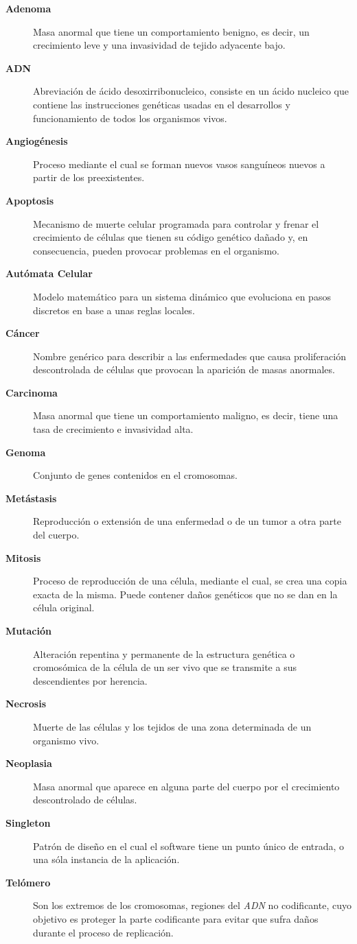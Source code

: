 \begin{description}
    \item[\textbf{Adenoma}] Masa anormal que tiene un comportamiento benigno, es decir, un crecimiento leve y una invasividad de tejido adyacente bajo.
    \item[\textbf{ADN}] Abreviación de ácido desoxirribonucleico, consiste en un ácido nucleico que contiene las instrucciones genéticas usadas en el desarrollos y funcionamiento de todos los organismos vivos.
    \item[\textbf{Angiogénesis}] Proceso mediante el cual se forman nuevos vasos sanguíneos nuevos a partir de los preexistentes.
    \item[\textbf{Apoptosis}] Mecanismo de muerte celular programada para controlar y frenar el crecimiento de células que tienen su código genético dañado y, en consecuencia, pueden provocar problemas en el organismo.
    \item[\textbf{Autómata Celular}] Modelo matemático para un sistema dinámico que evoluciona en pasos discretos en base a unas reglas locales.
    \item[\textbf{Cáncer}] Nombre genérico para describir a las enfermedades que causa proliferación descontrolada de células que provocan la aparición de masas anormales.
    \item[\textbf{Carcinoma}] Masa anormal que tiene un comportamiento maligno, es decir, tiene una tasa de crecimiento e invasividad alta.
    \item[\textbf{Genoma}] Conjunto de genes contenidos en el cromosomas.
    \item[\textbf{Metástasis}] Reproducción o extensión de una enfermedad o de un tumor a otra parte del cuerpo.
    \item[\textbf{Mitosis}] Proceso de reproducción de una célula, mediante el cual, se crea una copia exacta de la misma. Puede contener daños genéticos que no se dan en la célula original.
    \item[\textbf{Mutación}] Alteración repentina y permanente de la estructura genética o cromosómica de la célula de un ser vivo que se transmite a sus descendientes por herencia.
    \item[\textbf{Necrosis}] Muerte de las células y los tejidos de una zona determinada de un organismo vivo.
    \item[\textbf{Neoplasia}] Masa anormal que aparece en alguna parte del cuerpo por el crecimiento descontrolado de células.
    \item[\textbf{Singleton}] Patrón de diseño en el cual el software tiene un punto único de entrada, o una sóla instancia de la aplicación.
    \item[\textbf{Telómero}] Son los extremos de los cromosomas, regiones del \textit{ADN} no codificante, cuyo objetivo es proteger la parte codificante para evitar que sufra daños durante el proceso de replicación.
\end{description}
